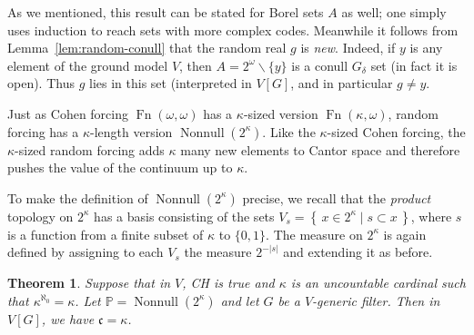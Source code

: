 \documentclass[11pt,oneside]{amsbook}
\newcommand{\set}[1]{\left\{\,#1\,\right\}}
\newcommand{\PP}{\mathbb P}
\DeclareMathOperator{\Fn}{Fn}
\DeclareMathOperator{\Nonnull}{Nonnull}
\theoremstyle{definition}
\theoremstyle{plain}
\newtheorem{thm}{Theorem}[section]
\theoremstyle{definition}
\theoremstyle{remark}
\numberwithin{equation}{section}
\numberwithin{figure}{section}
\begin{document}
As we mentioned, this result can be stated for Borel sets $A$ as well; one simply uses induction to reach sets with more complex codes. Meanwhile it follows from Lemma~\ref{lem:random-conull} that the random real $g$ is \emph{new}. Indeed, if $y$ is any element of the ground model $V$, then $A=2^\omega\smallsetminus\{y\}$ is a conull $G_\delta$ set (in fact it is open). Thus $g$ lies in this set (interpreted in $V[G]$, and in particular $g\neq y$.

Just as Cohen forcing $\Fn(\omega,\omega)$ has a $\kappa$-sized version $\Fn(\kappa,\omega)$, random forcing has a $\kappa$-length version $\Nonnull(2^\kappa)$. Like the $\kappa$-sized Cohen forcing, the $\kappa$-sized random forcing adds $\kappa$ many new elements to Cantor space and therefore pushes the value of the continuum up to $\kappa$.

To make the definition of $\Nonnull(2^\kappa)$ precise, we recall that the \emph{product} topology on $2^\kappa$ has a basis consisting of the sets $V_s=\set{x\in2^\kappa\mid s\subset x}$, where $s$ is a function from a finite subset of $\kappa$ to $\{0,1\}$. The measure on $2^\kappa$ is again defined by assigning to each $V_s$ the measure $2^{-|s|}$ and extending it as before.

\begin{thm}
  Suppose that in $V$, CH is true and $\kappa$ is an uncountable cardinal such that $\kappa^{\aleph_0}=\kappa$. Let $\PP=\Nonnull(2^\kappa)$ and let $G$ be a $V$-generic filter. Then in $V[G]$, we have $\mathfrak c=\kappa$.
\end{thm}
\end{document}
